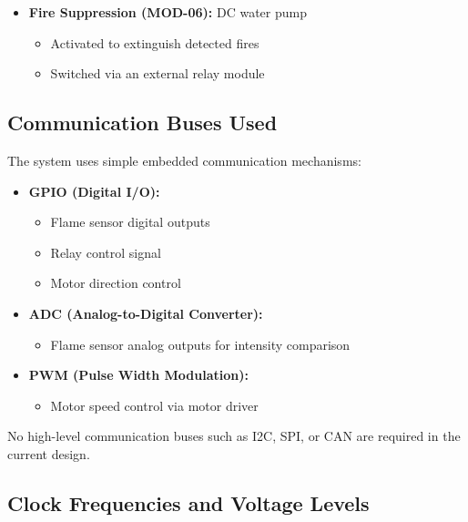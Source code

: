 \documentclass[12pt]{article}
\begin{document}
\begin{itemize}
    \item \textbf{Fire Suppression (MOD-06):} DC water pump
    \begin{itemize}
        \item Activated to extinguish detected fires
        \item Switched via an external relay module
    \end{itemize}\end{itemize}

\subsection{Communication Buses Used}

The system uses simple embedded communication mechanisms:

\begin{itemize}
    \item \textbf{GPIO (Digital I/O):}
    \begin{itemize}
        \item Flame sensor digital outputs
        \item Relay control signal
        \item Motor direction control
    \end{itemize}

    \item \textbf{ADC (Analog-to-Digital Converter):}
    \begin{itemize}
        \item Flame sensor analog outputs for intensity comparison
    \end{itemize}

    \item \textbf{PWM (Pulse Width Modulation):}
    \begin{itemize}
        \item Motor speed control via motor driver
    \end{itemize}

\end{itemize}

No high-level communication buses such as I2C, SPI, or CAN are required in the current design.

\subsection{Clock Frequencies and Voltage Levels}
\end{document}
